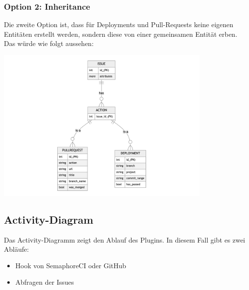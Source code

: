 \begin{minipage}{\textwidth}
  \subsubsection{Option 2: Inheritance}
  Die zweite Option ist, dass für Deployments und Pull-Requests keine eigenen Entitäten erstellt werden, sondern diese von
  einer gemeinsamen Entität erben. Das würde wie folgt aussehen:
  \begin{center}
    \includegraphics[width=0.8\textwidth]{images/erd/inheritance.png}
    \label{fig:erd_inheritance}
  \end{center}
\end{minipage}

\begin{minipage}{\textwidth}
  \subsection{Activity-Diagram}
  Das Activity-Diagramm zeigt den Ablauf des Plugins. In diesem Fall gibt es zwei Abläufe:
  \begin{itemize}
    \item Hook von SemaphoreCI oder GitHub
    \item Abfragen der Issues \newline
  \end{itemize}
\end{minipage}

